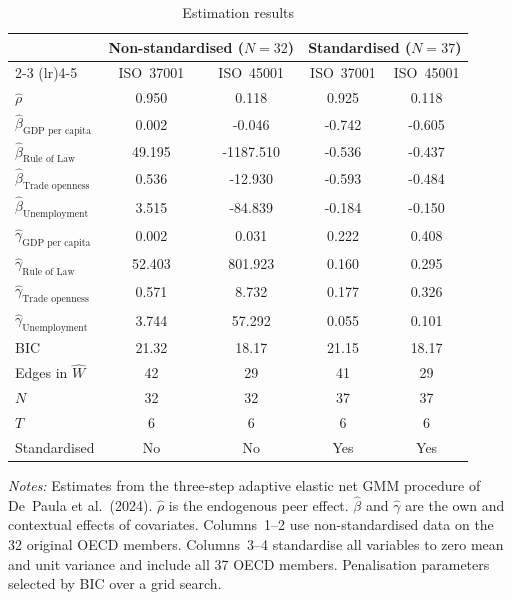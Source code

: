 \begin{table}[htbp]
\centering
\caption{Estimation results}
\label{tab:estimation}
\begin{tabular}{lcccc}
\hline\hline
 & \multicolumn{2}{c}{Non-standardised ($N=32$)} & \multicolumn{2}{c}{Standardised ($N=37$)} \\
\cmidrule(lr){2-3} \cmidrule(lr){4-5}
 & ISO~37001 & ISO~45001 & ISO~37001 & ISO~45001 \\
\hline
$\hat{\rho}$ & 0.950 & 0.118 & 0.925 & 0.118 \\
$\hat{\beta}_{\text{GDP per capita}}$ & 0.002 & -0.046 & -0.742 & -0.605 \\
$\hat{\beta}_{\text{Rule of Law}}$ & 49.195 & -1187.510 & -0.536 & -0.437 \\
$\hat{\beta}_{\text{Trade openness}}$ & 0.536 & -12.930 & -0.593 & -0.484 \\
$\hat{\beta}_{\text{Unemployment}}$ & 3.515 & -84.839 & -0.184 & -0.150 \\
$\hat{\gamma}_{\text{GDP per capita}}$ & 0.002 & 0.031 & 0.222 & 0.408 \\
$\hat{\gamma}_{\text{Rule of Law}}$ & 52.403 & 801.923 & 0.160 & 0.295 \\
$\hat{\gamma}_{\text{Trade openness}}$ & 0.571 & 8.732 & 0.177 & 0.326 \\
$\hat{\gamma}_{\text{Unemployment}}$ & 3.744 & 57.292 & 0.055 & 0.101 \\
\hline
BIC & 21.32 & 18.17 & 21.15 & 18.17 \\
Edges in $\hat{W}$ & 42 & 29 & 41 & 29 \\
$N$ & 32 & 32 & 37 & 37 \\
$T$ & 6 & 6 & 6 & 6 \\
Standardised & No & No & Yes & Yes \\
\hline\hline
\end{tabular}
\begin{minipage}{0.95\textwidth}
\vspace{4pt}
\footnotesize \textit{Notes:} Estimates from the three-step adaptive elastic net GMM procedure of De~Paula et al.\ (2024). $\hat{\rho}$ is the endogenous peer effect. $\hat{\beta}$ and $\hat{\gamma}$ are the own and contextual effects of covariates. Columns~1--2 use non-standardised data on the 32 original OECD members. Columns~3--4 standardise all variables to zero mean and unit variance and include all 37 OECD members. Penalisation parameters selected by BIC over a grid search.
\end{minipage}
\end{table}
